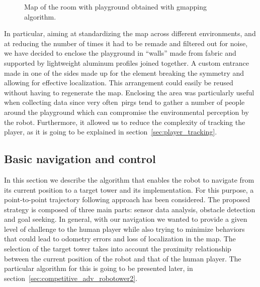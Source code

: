 \begin{figure}[h]
	\centering
	\caption{Map of the room with playground obtained with gmapping algorithm.} 
	\label{fig:playground_map}
\end{figure}

In particular, aiming at standardizing the map across different environments, and at reducing the number of times it had to be remade and filtered out for noise, we have decided to enclose the playground in ``walls'' made from fabric and supported by lightweight aluminum profiles joined together. A custom entrance made in one of the sides made up for the element breaking the symmetry and allowing for effective localization. This arrangement could easily be reused without having to regenerate the map. Enclosing the area was particularly useful when collecting data since very often~\glspl{pirg} tend to gather a number of people around the playground which can compromise the environmental perception by the robot. Furthermore, it allowed us to reduce the complexity of tracking the player, as it is going to be explained in section~\ref{sec:player_tracking}.

\subsection{Basic navigation and control}
In this section we describe the algorithm that enables the robot to navigate from its current position to a target tower and its implementation. For this purpose, a point-to-point trajectory following approach has been considered. The proposed strategy is composed of three main parts: sensor data analysis, obstacle detection and goal seeking. In general, with our navigation we wanted to provide a given level of challenge to the human player while also trying to minimize behaviors that could lead to odometry errors and loss of localization in the map. The selection of the target tower takes into account the proximity relationship between the current position of the robot and that of the human player. The particular algorithm for this is going to be presented later, in section~\ref{sec:competitive_adv_robotower2}.


